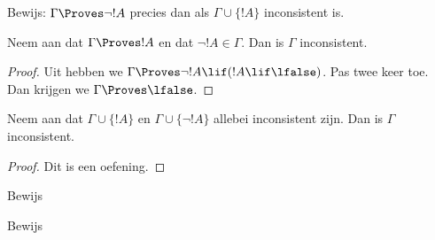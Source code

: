 \documentclass[../../../include/open-logic-section]{subfiles}
\begin{document}
\begin{prob}
Bewijs: $\Gamma \Proves \lnot !A$ precies dan als $\Gamma \cup
\{!A\}$ inconsistent is.
\end{prob}

\begin{prop}
  Neem aan dat $\Gamma \Proves !A$ en dat $\lnot !A \in \Gamma$.
  Dan is $\Gamma$ inconsistent.
\end{prop}

\begin{proof}
  Uit  hebben we $\Gamma \Proves \lnot !A \lif
  (!A \lif \lfalse)$. Pas  twee keer toe. Dan
  krijgen we $\Gamma \Proves \lfalse$.
\end{proof}


\begin{prop}
  Neem aan dat $\Gamma \cup \{!A\}$ en $\Gamma \cup \{\lnot !A\}$
  allebei inconsistent zijn. Dan is $\Gamma$ inconsistent.
\end{prop}

\begin{proof}
Dit is een oefening.
\end{proof}

\begin{prob}
  Bewijs 
\end{prob}
\tagendprob

\begin{prob}
  Bewijs 
\end{prob}
\tagendprob
\end{document}
